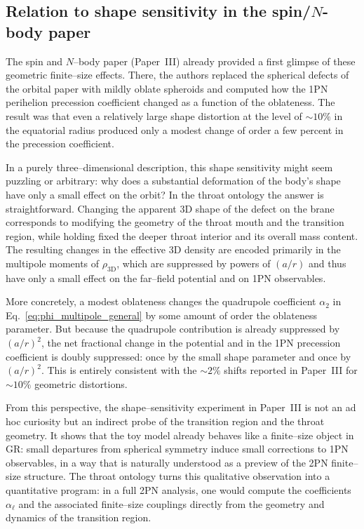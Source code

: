 \documentclass[12pt]{article}
\begin{document}
\subsection{Relation to shape sensitivity in the spin/\texorpdfstring{$N$}{N}-body paper}
\label{subsec:shape_sensitivity}

The spin and $N$--body paper (Paper~III) already provided a first glimpse of
these geometric finite--size effects.  There, the authors replaced the
spherical defects of the orbital paper with mildly oblate spheroids and
computed how the 1PN perihelion precession coefficient changed as a function
of the oblateness.  The result was that even a relatively large shape
distortion at the level of $\sim 10\%$ in the equatorial radius produced
only a modest change of order a few percent in the precession coefficient.

In a purely three--dimensional description, this shape sensitivity might
seem puzzling or arbitrary: why does a substantial deformation of the body's
shape have only a small effect on the orbit?  In the throat ontology the
answer is straightforward.  Changing the apparent 3D shape of the defect on
the brane corresponds to modifying the geometry of the throat mouth and the
transition region, while holding fixed the deeper throat interior and its
overall mass content.  The resulting changes in the effective 3D density are
encoded primarily in the multipole moments of $\rho_{\mathrm{3D}}$, which
are suppressed by powers of $(a/r)$ and thus have only a small effect on the
far--field potential and on 1PN observables.

More concretely, a modest oblateness changes the quadrupole coefficient
$\alpha_2$ in Eq.~\eqref{eq:phi_multipole_general} by some amount of order
the oblateness parameter.  But because the quadrupole contribution is
already suppressed by $(a/r)^2$, the net fractional change in the potential
and in the 1PN precession coefficient is doubly suppressed: once by the
small shape parameter and once by $(a/r)^2$.  This is entirely consistent
with the $\sim 2\%$ shifts reported in Paper~III for $\sim 10\%$ geometric
distortions.

From this perspective, the shape--sensitivity experiment in Paper~III is not
an ad hoc curiosity but an indirect probe of the transition region and the
throat geometry.  It shows that the toy model already behaves like a
finite--size object in GR: small departures from spherical symmetry induce
small corrections to 1PN observables, in a way that is naturally understood
as a preview of the 2PN finite--size structure.  The throat ontology turns
this qualitative observation into a quantitative program: in a full 2PN
analysis, one would compute the coefficients $\alpha_{\ell}$ and the
associated finite--size couplings directly from the geometry and dynamics of
the transition region.
\end{document}
